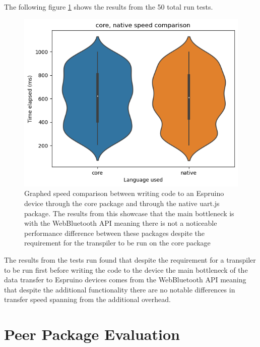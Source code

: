 \documentclass{l4proj}
\begin{document}
The following figure \ref{fig:core_native_speed} shows the results from the 50 total run tests.

\begin{figure}[H]
    \centering
    \includegraphics[width=12cm]{dissertation/images/core-native-speed.png}
    \caption{Graphed speed comparison between writing code to an Espruino device through the core package and through the native uart.js package. The results from this showcase that the main bottleneck is with the WebBluetooth API meaning there is not a noticeable performance difference between these packages despite the requirement for the transpiler to be run on the core package}
    \label{fig:core_native_speed}
\end{figure}

The results from the tests run found that despite the requirement for a transpiler to be run first before writing the code to the device the main bottleneck of the data transfer to Espruino devices comes from the WebBluetooth API meaning that despite the additional functionality there are no notable differences in transfer speed spanning from the additional overhead.

\section{Peer Package Evaluation}
\end{document}
